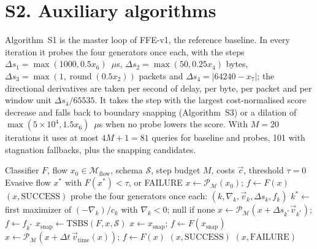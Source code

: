 \section*{S2. Auxiliary algorithms}

\setcounter{algorithm}{0}
\renewcommand{\thealgorithm}{S\arabic{algorithm}}

Algorithm~S1 is the master loop of FFE-v1, the reference baseline. In every iteration it probes the four generators once each, with the steps $\Delta s_1=\max(1000,0.5x_6)$~$\mu$s, $\Delta s_2=\max(50,0.25x_4)$ bytes, $\Delta s_3=\max(1,\operatorname{round}(0.5x_2))$ packets and $\Delta s_4=|64240-x_7|$; the directional derivatives are taken per second of delay, per byte, per packet and per window unit $\Delta s_4/65535$. It takes the step with the largest cost-normalised score decrease and falls back to boundary snapping (Algorithm~S3) or a dilation of $\max(5\times10^4,1.5x_6)$~$\mu$s when no probe lowers the score. With $M=20$ iterations it uses at most $4M+1=81$ queries for baseline and probes, 101 with stagnation fallbacks, plus the snapping candidates.

\begin{algorithm}[!t]
\footnotesize\linespread{1}\selectfont
\caption{FFE-v1 master loop (reference baseline)}
\label{alg:ffe_master}
\begin{algorithmic}[1]
\REQUIRE Classifier $F$, flow $x_0\in\mathcal{M}_{\text{flow}}$, schema $\mathcal{S}$, step budget $M$, costs $\vec c$, threshold $\tau=0$
\ENSURE Evasive flow $x^*$ with $F(x^*)<\tau$, or FAILURE
\STATE $x\leftarrow\mathcal{P}_{\mathcal{M}}(x_0)$; $f\leftarrow F(x)$
     \RETURN $(x,\text{SUCCESS})$ \ENDIF
    \STATE probe the four generators once each: $(k,\nabla_k,\vec v_k,\Delta s_k,f_k)$
    \STATE $k^*\leftarrow$ first maximizer of $(-\nabla_k)/c_k$ with $\nabla_k<0$; null if none
        \STATE $x\leftarrow\mathcal{P}_{\mathcal{M}}(x+\Delta s_{k^*}\vec v_{k^*})$; $f\leftarrow f_{k^*}$
    \ELSE
        \STATE $x_{\text{snap}}\leftarrow\text{TSBS}(F,x,\mathcal{S})$ 
         \STATE $x\leftarrow x_{\text{snap}}$; $f\leftarrow F(x_{\text{snap}})$
        \ELSE \STATE $x\leftarrow\mathcal{P}_{\mathcal{M}}(x+\Delta t\,\vec v_{\text{time}}(x))$; $f\leftarrow F(x)$ \ENDIF
    \ENDIF
\ENDFOR
{} \RETURN $(x,\text{SUCCESS})$ \ELSE \RETURN $(x,\text{FAILURE})$ \ENDIF
\end{algorithmic}
\end{algorithm}

